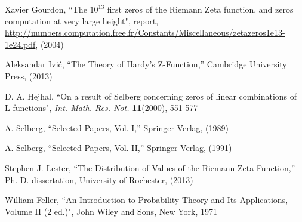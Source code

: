 \documentclass[twoside]{article}
\begin{document}
\begin{thebibliography}{10}
 Xavier Gourdon,
``The $10^{13}$ first zeros of the Riemann Zeta function,
and zeros computation at very large height", report,
\url{http://numbers.computation.free.fr/Constants/Miscellaneous/zetazeros1e13-1e24.pdf}, (2004)

 Aleksandar Ivi\'c, ``The Theory of Hardy's Z-Function,''
Cambridge University Press,  (2013)

 D. A. Hejhal,
``On a result of Selberg concerning zeros of linear combinations
of L-functions", 
{\it Int. Math. Res. Not.} {\bf11}(2000), 551-577

 A. Selberg, ``Selected Papers, Vol. I,''
Springer Verlag,  (1989)

 A. Selberg, ``Selected Papers, Vol. II,''
Springer Verlag,  (1991)

 Stephen J. Lester, ``The Distribution of Values of the
Riemann Zeta-Function,''
Ph. D. dissertation, University of Rochester,  (2013)

 William Feller,
``An Introduction to Probability Theory and Its Applications, Volume II (2 ed.)",
John Wiley and Sons, New York, 1971


\end{thebibliography} 
\end{document}

